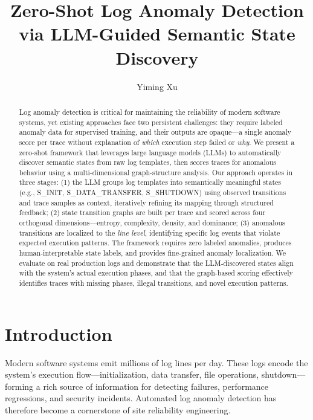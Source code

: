 \documentclass[11pt]{article}
\title{Zero-Shot Log Anomaly Detection via LLM-Guided Semantic State Discovery}
\author{Yiming Xu}
\date{}
\begin{document}
\maketitle

\begin{abstract}
Log anomaly detection is critical for maintaining the reliability of modern software systems, yet existing approaches face two persistent challenges: they require labeled anomaly data for supervised training, and their outputs are opaque---a single anomaly score per trace without explanation of \emph{which} execution step failed or \emph{why}. We present a zero-shot framework that leverages large language models (LLMs) to automatically discover semantic states from raw log templates, then scores traces for anomalous behavior using a multi-dimensional graph-structure analysis. Our approach operates in three stages: (1) the LLM groups log templates into semantically meaningful states (e.g., S\_INIT, S\_DATA\_TRANSFER, S\_SHUTDOWN) using observed transitions and trace samples as context, iteratively refining its mapping through structured feedback; (2) state transition graphs are built per trace and scored across four orthogonal dimensions---entropy, complexity, density, and dominance; (3) anomalous transitions are localized to the \emph{line level}, identifying specific log events that violate expected execution patterns. The framework requires zero labeled anomalies, produces human-interpretable state labels, and provides fine-grained anomaly localization. We evaluate on real production logs and demonstrate that the LLM-discovered states align with the system's actual execution phases, and that the graph-based scoring effectively identifies traces with missing phases, illegal transitions, and novel execution patterns.
\end{abstract}

\section{Introduction}

Modern software systems emit millions of log lines per day. These logs encode the system's execution flow---initialization, data transfer, file operations, shutdown---forming a rich source of information for detecting failures, performance regressions, and security incidents. Automated log anomaly detection has therefore become a cornerstone of site reliability engineering.
\end{document}

